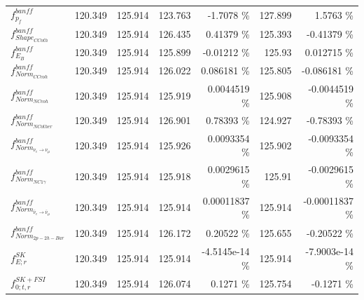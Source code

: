 \begin{table}
\begin{tabular}{| l | r | r | r  r | r  r |}
                                                             $f_{p_{f}}^{banff}$ &         120.349 & 125.914 & 123.763 &         -1.7078 \%  &         127.899 &          1.5763 \%  \\ 
                                                     $f_{Shape_{CCoth}}^{banff}$ &         120.349 & 125.914 & 126.435 &         0.41379 \%  &         125.393 &        -0.41379 \%  \\ 
                                                             $f_{E_{B}}^{banff}$ &         120.349 & 125.914 & 125.899 &        -0.01212 \%  &          125.93 &        0.012715 \%  \\ 
                                                      $f_{Norm_{CCcoh}}^{banff}$ &         120.349 & 125.914 & 126.022 &        0.086181 \%  &         125.805 &       -0.086181 \%  \\ 
                                                      $f_{Norm_{NCcoh}}^{banff}$ &         120.349 & 125.914 & 125.919 &       0.0044519 \%  &         125.908 &      -0.0044519 \%  \\ 
                                                    $f_{Norm_{NCother}}^{banff}$ &         120.349 & 125.914 & 126.901 &         0.78393 \%  &         124.927 &        -0.78393 \%  \\ 
                                  $f_{Norm_{\nu_e \rightarrow \nu_\mu}}^{banff}$ &         120.349 & 125.914 & 125.926 &       0.0093354 \%  &         125.902 &      -0.0093354 \%  \\ 
                                                  $f_{Norm_{NC1\gamma}}^{banff}$ &         120.349 & 125.914 & 125.918 &       0.0029615 \%  &          125.91 &      -0.0029615 \%  \\ 
                      $f_{Norm_{\bar{\nu}_e \rightarrow \bar{\nu}_\mu}}^{banff}$ &         120.349 & 125.914 & 125.914 &      0.00011837 \%  &         125.914 &     -0.00011837 \%  \\ 
                                                     $f_{Norm_{2p-2h-Bar}}^{banff}$ &         120.349 & 125.914 & 126.172 &         0.20522 \%  &         125.655 &        -0.20522 \%  \\ 
                                                                 $f_{E; r}^{SK}$ &         120.349 & 125.914 & 125.914 &     -4.5145e-14 \%  &         125.914 &     -7.9003e-14 \%  \\ 
                                                          $f_{0; t, r}^{SK+FSI}$ &         120.349 & 125.914 & 126.074 &          0.1271 \%  &         125.754 &         -0.1271 \%  \\ 

\end{tabular}
\end{table}
